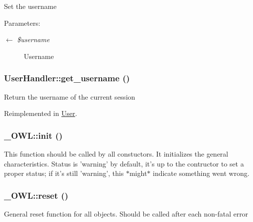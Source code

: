 Set the username \begin{Desc}
\item[Parameters:]
\begin{description}
\item[\mbox{$\leftarrow$} {\em \$username}]Username \end{description}
\end{Desc}
\hypertarget{classUserHandler_76e8c8b88c8d92f2d03645e810b9253c}{
\subsubsection{\setlength{\rightskip}{0pt plus 5cm}UserHandler::get\_\-username ()}}
\label{classUserHandler_76e8c8b88c8d92f2d03645e810b9253c}


Return the username of the current session 

Reimplemented in \hyperlink{classUser_1348ddf190d4df2518665fb51305a902}{User}.\hypertarget{class__OWL_e0ef3ded56e8a6b34b6461e5a721cd3e}{
\subsubsection{\setlength{\rightskip}{0pt plus 5cm}\_\-OWL::init ()}}
\label{class__OWL_e0ef3ded56e8a6b34b6461e5a721cd3e}


This function should be called by all constuctors. It initializes the general characteristics. Status is 'warning' by default, it's up to the contructor to set a proper status; if it's still 'warning', this $\ast$might$\ast$ indicate something went wrong. \hypertarget{class__OWL_2f2a042bcf31965194c03033df0edc9b}{
\subsubsection{\setlength{\rightskip}{0pt plus 5cm}\_\-OWL::reset ()}}
\label{class__OWL_2f2a042bcf31965194c03033df0edc9b}


General reset function for all objects. Should be called after each non-fatal error 

